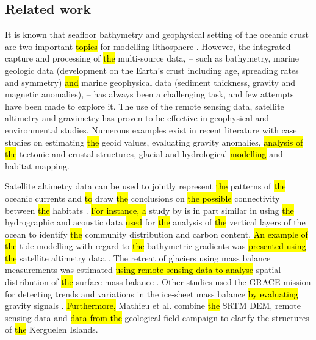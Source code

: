 \documentclass[geomatics,article,submit,pdftex,moreauthors]{Definitions/mdpi}
\begin{document}
\subsection{Related work}

It is known that seafloor bathymetry and geophysical setting of the oceanic crust are two important \hl{topics} for modelling lithosphere \cite{WATSON201697}. However, the integrated capture and processing of \hl{the }multi-source data, -- such as bathymetry, marine geologic data (development on the Earth's crust including age, spreading rates and symmetry) \hl{and} marine geophysical data (sediment thickness, gravity and magnetic anomalies), -- has always been a challenging task, and few attempts have been made to explore it. The use of the remote sensing data, satellite altimetry and gravimetry has proven to be effective in geophysical and environmental studies. Numerous examples exist in recent literature with case studies on estimating \hl{the }geoid values, evaluating gravity anomalies, \hl{analysis of the }tectonic and crustal structures, glacial and hydrological \hl{modelling} and habitat mapping. 

Satellite altimetry data can be used to jointly represent \hl{the }patterns of \hl{the }oceanic currents and \hl{to }draw \hl{the }conclusions on \hl{the possible }connectivity between \hl{the }habitats \cite{MORI201645}. \hl{For instance, a} study by \cite{COTTE2022103650} is in part similar in using \hl{the }hydrographic and acoustic data \hl{used }for \hl{the }analysis of \hl{the }vertical layers of the ocean to identify \hl{the }community distribution and carbon content. \hl{An example of the }tide modelling with regard to \hl{the }bathymetric gradients was \hl{presented using the} satellite altimetry data \cite{Maraldi}. The retreat of glaciers using mass balance measurements was estimated \hl{using remote sensing data to analyse }spatial distribution of \hl{the }surface mass balance \cite{Verfaillie}. Other studies used the GRACE mission for detecting trends and variations in the ice-sheet mass balance \hl{by evaluating} gravity signals \cite{YAMAMOTO2008267}. \hl{Furthermore, }Mathieu et al. \cite{MATHIEU2011206} combine \hl{the }SRTM DEM, remote sensing data and \hl{data from the }geological field campaign to clarify the structures of \hl{the }Kerguelen Islands. 
\end{document}

